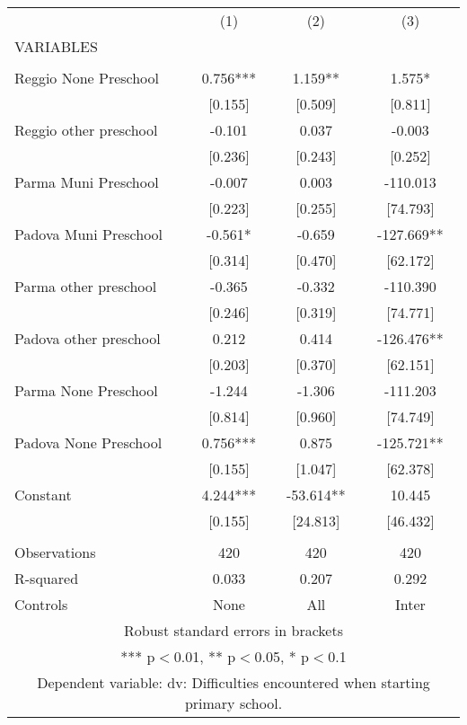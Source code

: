 \begin{tabular}{lccc} \hline
 & (1) & (2) & (3) \\
VARIABLES &  &  &  \\ \hline
 &  &  &  \\
Reggio None Preschool & 0.756*** & 1.159** & 1.575* \\
 & [0.155] & [0.509] & [0.811] \\
Reggio other preschool & -0.101 & 0.037 & -0.003 \\
 & [0.236] & [0.243] & [0.252] \\
Parma Muni Preschool & -0.007 & 0.003 & -110.013 \\
 & [0.223] & [0.255] & [74.793] \\
Padova Muni Preschool & -0.561* & -0.659 & -127.669** \\
 & [0.314] & [0.470] & [62.172] \\
Parma other preschool & -0.365 & -0.332 & -110.390 \\
 & [0.246] & [0.319] & [74.771] \\
Padova other preschool & 0.212 & 0.414 & -126.476** \\
 & [0.203] & [0.370] & [62.151] \\
Parma None Preschool & -1.244 & -1.306 & -111.203 \\
 & [0.814] & [0.960] & [74.749] \\
Padova None Preschool & 0.756*** & 0.875 & -125.721** \\
 & [0.155] & [1.047] & [62.378] \\
Constant & 4.244*** & -53.614** & 10.445 \\
 & [0.155] & [24.813] & [46.432] \\
 &  &  &  \\
Observations & 420 & 420 & 420 \\
R-squared & 0.033 & 0.207 & 0.292 \\
 Controls & None & All & Inter \\ \hline
\multicolumn{4}{c}{ Robust standard errors in brackets} \\
\multicolumn{4}{c}{ *** p$<$0.01, ** p$<$0.05, * p$<$0.1} \\
\multicolumn{4}{c}{ Dependent variable: dv: Difficulties encountered when starting primary school.} \\
\end{tabular}
